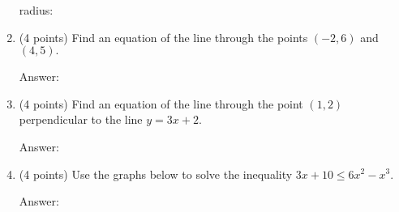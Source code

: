 \documentclass[11pt]{article}
\begin{document}
\begin{enumerate}
\begin{flushright}{radius: \underline{\hspace{2in}}}\end{flushright}

\item (4 points) Find an equation of the line through the points $(-2,6)$ and $(4,5).$

\begin{flushright}{Answer: \underline{\hspace{2in}}}\end{flushright}
\vfill

\item (4 points) Find an equation of the line through the point $(1,2)$ perpendicular to the line $y=3x+2.$

\begin{flushright}{Answer: \underline{\hspace{2in}}}\end{flushright}
\vfill

\item (4 points) Use the graphs below to solve the inequality $3x+10 \leq 6x^2-x^3.$\\
\begin{flushright}{Answer: \underline{\hspace{2in}}}\end{flushright}

\end{enumerate}
\end{document}

